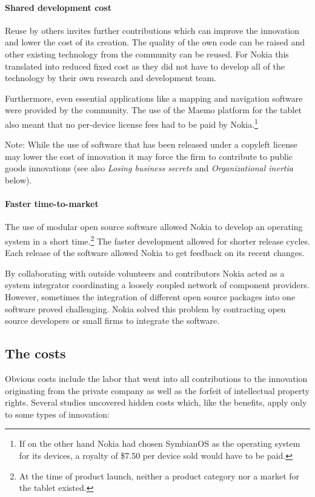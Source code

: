 \documentclass[a4paper]{scrartcl}
\begin{document}
\paragraph{Shared development cost}
Reuse by others invites further contributions which can improve the innovation and lower the cost of its creation.
The quality of the own code can be raised and other existing technology from the community can be reused.
For Nokia this translated into reduced fixed cost as they did not have to develop all of the technology by their own research and development team.

Furthermore, even essential applications like a mapping and navigation software were provided by the community. 
The use of the Maemo platform for the tablet also meant that no per-device license fees had to be paid by Nokia.\footnote{If on the other hand Nokia had chosen SymbianOS as the operating system for its devices, a royalty of \$7.50 per device sold would have to be paid.}

Note: While the use of software that has been released under a copyleft license may lower the cost of innovation it may force the firm to contribute to public goods innovations (see also \emph{Losing business secrets} and \emph{Organizational inertia} below).

\paragraph{Faster time-to-market}
The use of modular open source software allowed Nokia to develop an operating system in a short time.\footnote{At the time of product launch, neither a product category nor a market for the tablet existed.}
The faster development allowed for shorter release cycles.
Each release of the software allowed Nokia to get feedback on its recent changes.

By collaborating with outside volunteers and contributors Nokia acted as a system integrator coordinating a loosely coupled network of component providers.
However, sometimes the integration of different open source packages into one software proved challenging. 
Nokia solved this problem by contracting open source developers or small firms to integrate the software. 

\subsection{The costs}

Obvious costs include the labor that went into all contributions to the innovation originating from the private company as well as the forfeit of intellectual property rights.
Several studies uncovered hidden costs which, like the benefits, apply only to some types of innovation:
\end{document}
